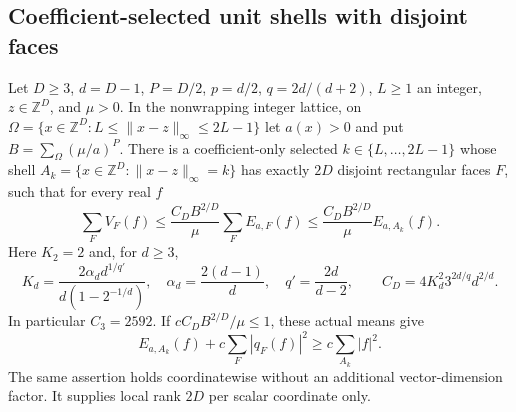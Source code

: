 \subsection{Coefficient-selected unit shells with disjoint faces}
\begin{theorem}\label{thm:selected221}
Let $D\ge3$, $d=D-1$, $P=D/2$, $p=d/2$, $q=2d/(d+2)$,
$L\ge1$ an integer, $z\in\mathbb Z^D$, and $\mu>0$. In the nonwrapping integer lattice, on
$\Omega=\{x\in\mathbb Z^D:L\le\|x-z\|_\infty\le2L-1\}$ let $a(x)>0$ and put
$B=\sum_\Omega(\mu/a)^P$. There is a coefficient-only selected
$k\in\{L,\ldots,2L-1\}$ whose shell $A_k=\{x\in\mathbb Z^D:\|x-z\|_\infty=k\}$ has exactly $2D$
disjoint rectangular faces $F$, such that for every real $f$
\begin{equation}\label{eq:selected221}
 \sum_F V_F(f)\le \frac{C_DB^{2/D}}{\mu}\sum_F E_{a,F}(f)
 \le \frac{C_DB^{2/D}}{\mu}E_{a,A_k}(f).
\end{equation}
Here $K_2=2$ and, for $d\ge3$,
\[
 K_d=\frac{2\alpha_d d^{1/q'}}{d(1-2^{-1/d})},\quad
 \alpha_d=\frac{2(d-1)}d,\quad q'=\frac{2d}{d-2},\qquad
 C_D=4K_d^2 3^{2d/q}d^{2/d}.
\]
In particular $C_3=2592$. If $cC_DB^{2/D}/\mu\le1$, these actual
means give
\[
 E_{a,A_k}(f)+c\sum_F|q_F(f)|^2\ge c\sum_{A_k}|f|^2.
\]
The same assertion holds coordinatewise without an additional vector-dimension
factor. It supplies local rank $2D$ per scalar coordinate only.
\end{theorem}
